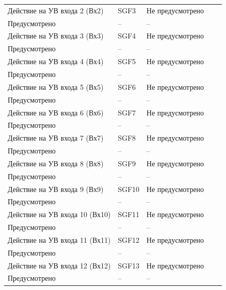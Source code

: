 \begin{longtable}{|>{\centering\arraybackslash}m{5.3cm}|>{\centering\arraybackslash}m{3.3cm}|>{\centering\arraybackslash}m{4.2cm}|>{\centering\arraybackslash}m{1.8cm}|>{\centering\arraybackslash}m{1cm}|}
\hline
\centering Действие на УВ входа 2 (Вх2)  & \centering SGF3 & \centering Не предусмотрено \\ Предусмотрено & \centering -- & \centering \arraybackslash -- \\
\hline
\centering Действие на УВ входа 3 (Вх3)  & \centering SGF4 & \centering Не предусмотрено \\ Предусмотрено & \centering -- & \centering \arraybackslash -- \\
\hline
\centering Действие на УВ входа 4 (Вх4)  & \centering SGF5 & \centering Не предусмотрено \\ Предусмотрено & \centering -- & \centering \arraybackslash -- \\
\hline
\centering Действие на УВ входа 5 (Вх5)  & \centering SGF6 & \centering Не предусмотрено \\ Предусмотрено & \centering -- & \centering \arraybackslash -- \\
\hline
\centering Действие на УВ входа 6 (Вх6)  & \centering SGF7 & \centering Не предусмотрено \\ Предусмотрено & \centering -- & \centering \arraybackslash -- \\
\hline
\centering Действие на УВ входа 7 (Вх7)  & \centering SGF8 & \centering Не предусмотрено \\ Предусмотрено & \centering -- & \centering \arraybackslash -- \\
\hline
\centering Действие на УВ входа 8 (Вх8)  & \centering SGF9 & \centering Не предусмотрено \\ Предусмотрено & \centering -- & \centering \arraybackslash -- \\
\hline
\centering Действие на УВ входа 9 (Вх9)  & \centering SGF10 & \centering Не предусмотрено \\ Предусмотрено & \centering -- & \centering \arraybackslash -- \\
\hline
\centering Действие на УВ входа 10 (Вх10)  & \centering SGF11 & \centering Не предусмотрено \\ Предусмотрено & \centering -- & \centering \arraybackslash -- \\
\hline
\centering Действие на УВ входа 11 (Вх11)  & \centering SGF12 & \centering Не предусмотрено \\ Предусмотрено & \centering -- & \centering \arraybackslash -- \\
\hline
\centering Действие на УВ входа 12 (Вх12)  & \centering SGF13 & \centering Не предусмотрено \\ Предусмотрено & \centering -- & \centering \arraybackslash -- \\

\end{longtable}
